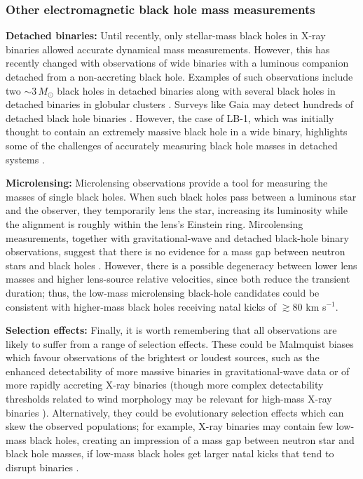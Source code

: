 \documentclass[review]{elsarticle}
\begin{document}
\subsubsection{Other electromagnetic black hole mass measurements} \label{sec:lensing}

\textbf{Detached binaries:} Until recently, only stellar-mass black holes in X-ray binaries allowed accurate dynamical mass measurements.  However, this has recently changed with observations of wide binaries with a luminous companion detached from a non-accreting black hole.  Examples of such observations include two $\sim 3\, M_\odot$ black holes in detached binaries \citep{Thompson:2019,Jayasinghe:2021} along with several black holes in detached binaries in globular clusters \citep{Giesers:2019,Saracino:2021}.  Surveys like Gaia may detect hundreds of detached black hole binaries \citep[e.g.,][]{Chawla:2021}.  However, the case of LB-1, which was initially thought to contain an extremely massive black hole in a wide binary, highlights some of the challenges of accurately measuring black hole masses in detached systems \citep{Liu:2019,Eldridge:2020,AbdulMassih:2020,Shenar:2020}.   

\textbf{Microlensing:} Microlensing observations provide a tool for measuring the masses of single black holes.  When such black holes pass between a luminous star and the observer, they temporarily lens the star, increasing its luminosity while the alignment is roughly within the lens's Einstein ring.  Mircolensing measurements, together with gravitational-wave and detached black-hole binary observations, suggest that there is no evidence for a mass gap between neutron stars and black holes \citep{WyrzykowskiMandel:2019, Mroz:2021}.  However, there is a possible degeneracy between lower lens masses and higher lens-source relative velocities, since both reduce the transient duration; thus, the low-mass microlensing black-hole candidates could be consistent with higher-mass black holes receiving natal kicks of $\gtrsim 80$ km s$^{-1}$.

\textbf{Selection effects:} Finally, it is worth remembering that all observations are likely to suffer from a range of selection effects.  These could be Malmquist biases which favour observations of the brightest or loudest sources, such as the enhanced detectability of more massive binaries in gravitational-wave data or of more rapidly accreting X-ray binaries (though more complex detectability thresholds related to wind morphology may be relevant for high-mass X-ray binaries \citep{HiraiMandel:2021}).  Alternatively, they could be evolutionary selection effects which can skew the observed populations; for example, X-ray binaries may contain few low-mass black holes, creating an impression of a mass gap between neutron star and black hole masses, if low-mass black holes get larger natal kicks that tend to disrupt binaries \citep{Mandel:2020}.
\end{document}
